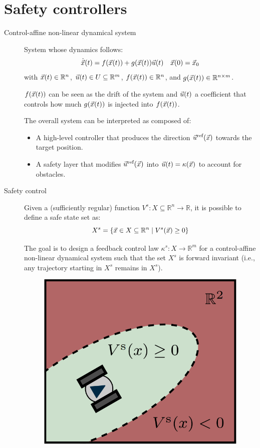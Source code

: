 \chapter{Safety controllers}


\begin{description}
    \item[Control-affine non-linear dynamical system] 
        System whose dynamics follows:
        \[
            \dot{{\vec{x}}}(t) = f({\vec{x}}(t)) + g({\vec{x}}(t)) {\vec{u}}(t) \quad {\vec{x}}(0) = {\vec{x}}_0
        \]
        with ${\vec{x}}(t) \in \mathbb{R}^n$, ${\vec{u}}(t) \in U \subseteq \mathbb{R}^m$, $f({\vec{x}}(t)) \in \mathbb{R}^n$, and $g({\vec{x}}(t)) \in \mathbb{R}^{n \times m}$.

        $f({\vec{x}}(t))$ can be seen as the drift of the system and ${\vec{u}}(t)$ a coefficient that controls how much $g({\vec{x}}(t))$ is injected into $f({\vec{x}}(t))$.

        The overall system can be interpreted as composed of:
        \begin{itemize}
            \item A high-level controller that produces the direction ${\vec{u}}^\text{ref}({\vec{x}})$ towards the target position.
            \item A safety layer that modifies ${\vec{u}}^\text{ref}({\vec{x}})$ into ${\vec{u}}(t) = \kappa({\vec{x}})$ to account for obstacles.
        \end{itemize}

    \item[Safety control] 
        Given a (sufficiently regular) function $V^s: X \subseteq \mathbb{R}^n \rightarrow \mathbb{R}$, it is possible to define a safe state set as:
        \[
            X^s = \{ {\vec{x}} \in X \subseteq \mathbb{R}^n \mid V^s({\vec{x}}) \geq 0 \}
        \]

        The goal is to design a feedback control law $\kappa^s: X \rightarrow \mathbb{R}^m$ for a control-affine non-linear dynamical system such that the set $X^s$ is forward invariant (i.e., any trajectory starting in $X^s$ remains in $X^s$).

        \begin{figure}[H]
            \centering
            \includegraphics[width=0.25\linewidth]{./img/safety_control.png}
        \end{figure}


\end{description}
